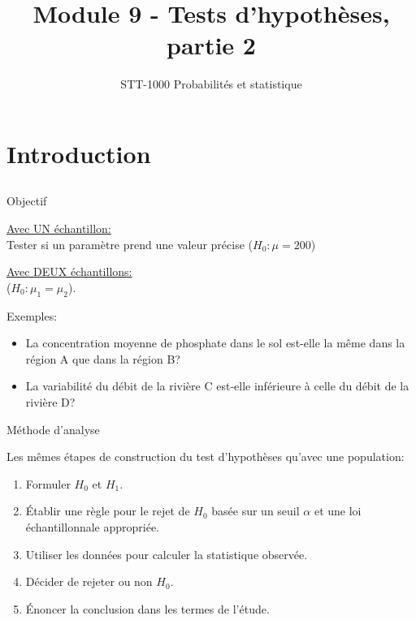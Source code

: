 \documentclass{BeamerTemplate}
\title{Module 9 - Tests d'hypothèses, partie 2}
\subtitle{STT-1000 Probabilités et statistique}
\begin{document}
\AtBeginSection{\frame{\sectionpage}}

\begin{frame}
\titlepage
\end{frame}

\section[Intro]{Introduction}

\subsection*{ }

\begin{frame}[t]{Objectif}

\underline{Avec UN échantillon:}\\
Tester si un paramètre prend une valeur précise  ($H_0:\mu=200$)\\

\medskip

\underline{Avec DEUX échantillons:}\\
  ($H_0:\mu_1=\mu_2$).

\bigskip
Exemples:
    \begin{itemize}
    \item La concentration moyenne de phosphate dans le sol est-elle la même dans la région A que dans la région B?
    \item La variabilité du débit de la rivière C est-elle inférieure à celle du débit de la rivière D?
    \end{itemize}
\end{frame}

\begin{frame}[t]{Méthode d'analyse}

Les mêmes étapes de construction du test d'hypothèses qu'avec une population:

\vspace{0.3cm}
\begin{enumerate}[1)]\itemsep0.35cm
  \item Formuler  $H_0$ et $H_1$.
  \item \'Etablir une règle pour le rejet de $H_0$ basée sur un seuil $\alpha$ et une loi échantillonnale appropriée.
  \item Utiliser les données  pour calculer la statistique observée.
  \item Décider de rejeter ou non  $H_0$.
  \item \'Enoncer la conclusion dans les termes de l'étude.
\end{enumerate}

\end{frame}
\end{document}
